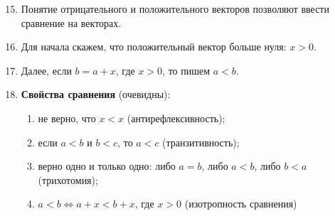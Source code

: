 \begin{enumerate}\setcounter{enumi}{14}
\item Понятие отрицательного и положительного векторов позволяют ввести сравнение на векторах.
\item Для начала скажем, что положительный вектор больше нуля: $x>0$.
\item Далее, если $b=a+x$, где $x>0$, то пишем $a<b$.
\item \textbf{Свойства сравнения} (очевидны):
\begin{enumerate}[label=O\arabic*]
\item не верно, что $x<x$ (антирефлексивность);
\item если $a<b$ и $b<c$, то $a<c$ (транзитивность);
\item верно одно и только одно: либо $a=b$, либо $a<b$, либо $b<a$ (трихотомия);
\item $a<b\Leftrightarrow a+x<b+x$, где $x>0$ (изотропность сравнения)
\end{enumerate}

\end{enumerate}




